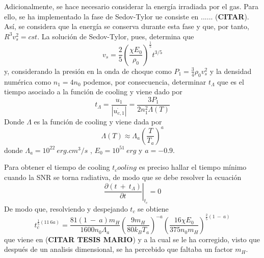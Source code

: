 Adicionalmente, se hace necesario considerar la energía irradiada por el gas. Para ello, se ha implementado la fase de Sedov-Tylor ue consiste en ...... (\textbf{CITAR}). Así, se considera que la energía se conserva durante esta fase y que, por tanto, $R^3v_s^2 = cst$. La solución de Sedov-Tylor, pues, determina que 
\begin{equation}
	v_s = \frac{2}{5} \left(\frac{\chi E_0}{\rho_0}\right)^\frac{1}{5} t^{3/5}
\end{equation}
y, considerando la presión en la onda de choque como $P_1 = \frac{3}{4} \rho_0 v_s^2$ y la densidad numérica como $n_1 = 4n_0$ podemos, por consecuencia, determinar $t_\Lambda$ que es el tiempo asociado a la función de cooling y viene dado por
\begin{equation}
	t_\Lambda = \frac{u_1}{\left| \dot{u_{c,1}} \right|} = \frac{3P_1}{2n_1^2 \Lambda(T)}
\end{equation}
Donde $\Lambda$ es la función de cooling y viene dada por 
\begin{equation}
	\Lambda(T) \approx \Lambda_a \left(\frac{T}{T_a}\right)^a
\end{equation}
donde $\Lambda_a = 10^{22} \  \unit{erg.cm^3/s}$ , $E_0 = 10^{51} \ \unit{erg}$ y $a = -0.9$.

Para obtener el tiempo de cooling $t_cooling$ es preciso hallar el tiempo mínimo cuando la SNR se torna radiativa, de modo que se debe resolver la ecuación
\begin{equation}
	\left.\frac{\partial (t \ + \ t_\Lambda)}{\partial t} \right|_{t_c} =  0
\end{equation}
De modo que, resolviendo y despejando $t_c$ se obtiene
\begin{equation}
	t_c^{\frac{1}{5}(11 \ 6a)} = \frac{81(1 \ - \ a)m_H}{1600n_0\Lambda_a} \left(\frac{9m_H}{80 k_BT_a}\right)^{-a} \left(\frac{16 \chi E_0}{375 n_0 m_H} \right) ^{\frac{2}{5}(1 \ - \ a)}
\end{equation}
que viene en (\textbf{CITAR TESIS MARIO}) y a la cual se le ha corregido, visto que después de un analisis dimensional, se ha percebido que faltaba un factor $m_H$.

